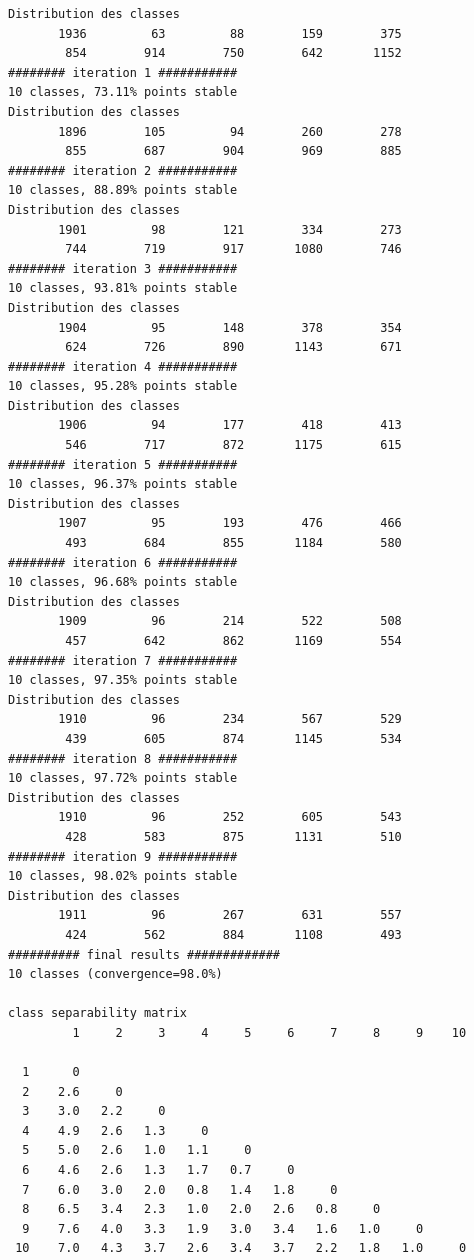 \documentclass[environments,article,submit,pdftex,moreauthors]{Definitions/mdpi}
\begin{document}
\begin{scriptsize}
\begin{verbatim}
Distribution des classes
       1936         63         88        159        375
        854        914        750        642       1152
######## iteration 1 ###########
10 classes, 73.11% points stable
Distribution des classes
       1896        105         94        260        278
        855        687        904        969        885
######## iteration 2 ###########
10 classes, 88.89% points stable
Distribution des classes
       1901         98        121        334        273
        744        719        917       1080        746
######## iteration 3 ###########
10 classes, 93.81% points stable
Distribution des classes
       1904         95        148        378        354
        624        726        890       1143        671
######## iteration 4 ###########
10 classes, 95.28% points stable
Distribution des classes
       1906         94        177        418        413
        546        717        872       1175        615
######## iteration 5 ###########
10 classes, 96.37% points stable
Distribution des classes
       1907         95        193        476        466
        493        684        855       1184        580
######## iteration 6 ###########
10 classes, 96.68% points stable
Distribution des classes
       1909         96        214        522        508
        457        642        862       1169        554
######## iteration 7 ###########
10 classes, 97.35% points stable
Distribution des classes
       1910         96        234        567        529
        439        605        874       1145        534
######## iteration 8 ###########
10 classes, 97.72% points stable
Distribution des classes
       1910         96        252        605        543
        428        583        875       1131        510
######## iteration 9 ###########
10 classes, 98.02% points stable
Distribution des classes
       1911         96        267        631        557
        424        562        884       1108        493
########## final results #############
10 classes (convergence=98.0%)

class separability matrix
         1     2     3     4     5     6     7     8     9    10

  1      0
  2    2.6     0
  3    3.0   2.2     0
  4    4.9   2.6   1.3     0
  5    5.0   2.6   1.0   1.1     0
  6    4.6   2.6   1.3   1.7   0.7     0
  7    6.0   3.0   2.0   0.8   1.4   1.8     0
  8    6.5   3.4   2.3   1.0   2.0   2.6   0.8     0
  9    7.6   4.0   3.3   1.9   3.0   3.4   1.6   1.0     0
 10    7.0   4.3   3.7   2.6   3.4   3.7   2.2   1.8   1.0     0



\end{verbatim}
\end{scriptsize}
\end{document}

